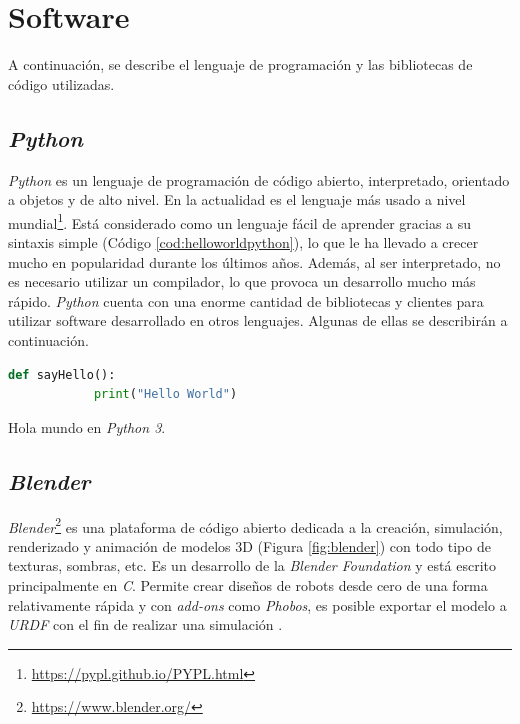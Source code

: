 \section{Software}
A continuación, se describe el lenguaje de programación y las bibliotecas de código utilizadas.

\subsection{\textit{Python}}
\label{subsection:python}
\textit{Python} es un lenguaje de programación de código abierto, interpretado, orientado a objetos y de alto nivel. En la actualidad es el lenguaje más usado a nivel mundial\footnote{\url{https://pypl.github.io/PYPL.html}}. Está considerado como un lenguaje fácil de aprender gracias a su sintaxis simple (Código \ref{cod:helloworldpython}), lo que le ha llevado a crecer mucho en popularidad durante los últimos años. Además, al ser interpretado, no es necesario utilizar un compilador, lo que provoca un desarrollo mucho más rápido. \textit{Python} cuenta con una enorme cantidad de bibliotecas y clientes para utilizar software desarrollado en otros lenguajes. Algunas de ellas se describirán a continuación.\\

\begin{code}[h]
	\begin{lstlisting}[language=Python]
		def sayHello():
			print("Hello World")
	\end{lstlisting}
	\caption[Hola mundo en \textit{Python 3}.]{Hola mundo en \textit{Python 3}.}
	\label{cod:helloworldpython}
\end{code}

\subsection{\textit{Blender}}
\label{subsection:blender}
\textit{Blender}\footnote{\url{https://www.blender.org/}} es una plataforma de código abierto dedicada a la creación, simulación, renderizado y animación de modelos 3D (Figura \ref{fig:blender}) con todo tipo de texturas, sombras, etc. Es un desarrollo de la \textit{Blender Foundation} y está escrito principalmente en \textit{C}. Permite crear diseños de robots desde cero de una forma relativamente rápida y con \textit{add-ons} como \textit{Phobos}, es posible exportar el modelo a \textit{URDF} con el fin de realizar una simulación \cite{phobos}.\\

